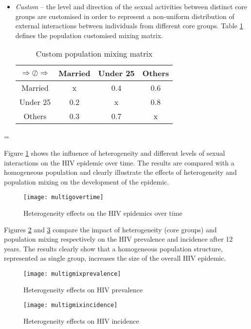 \begin{itemize}
    \item \emph{Custom} --  the level and direction of the sexual activities between
    distinct core groups are customised in order to represent a non-uniform distribution
    of external interactions between individuals from different core groups.
    Table \ref{custommixmat} defines the population customised mixing matrix.
    \begin{longtable}[c]{|c|c|c|c|}
    \caption{Custom population mixing matrix}\\ \hline
    \label{custommixmat}
    $\Rightarrow \oslash \Rightarrow $ & Married & Under 25 & Others \\\hline
    Married  & x       & 0.4      & 0.6    \\\hline
    Under 25 & 0.2     & x        & 0.8    \\\hline
    Others   & 0.3     & 0.7      & x      \\\hline
    \end{longtable}
\end{itemize}
\parskip=\baselineskip

Figure \ref{multigovertime} shows the influence of heterogeneity and different levels of
sexual interactions on the HIV epidemic over time. The results are compared with a
homogeneous population and clearly illustrate the effects of heterogeneity and population
mixing on the development of the epidemic.
\begin{figure}[h]
\texttt{[image: multigovertime]}
\caption{Heterogeneity effects on the HIV epidemics over time} \label{multigovertime}
\end{figure}

Figures \ref{multigmixprevalence} and \ref{multigmixincidence} compare the impact of
heterogeneity (core groups) and population mixing respectively on the HIV prevalence and
incidence after 12 years. The results clearly show that a homogeneous population
structure, represented as single group, increases the size of the overall HIV
epidemic.\clearpage

\begin{figure}[!ht]
\texttt{[image: multigmixprevalence]}
\caption{Heterogeneity effects on HIV prevalence} \label{multigmixprevalence}
\end{figure}

\begin{figure}[!ht]
\texttt{[image: multigmixincidence]}
\caption{Heterogeneity effects on HIV incidence} \label{multigmixincidence}
\end{figure}

